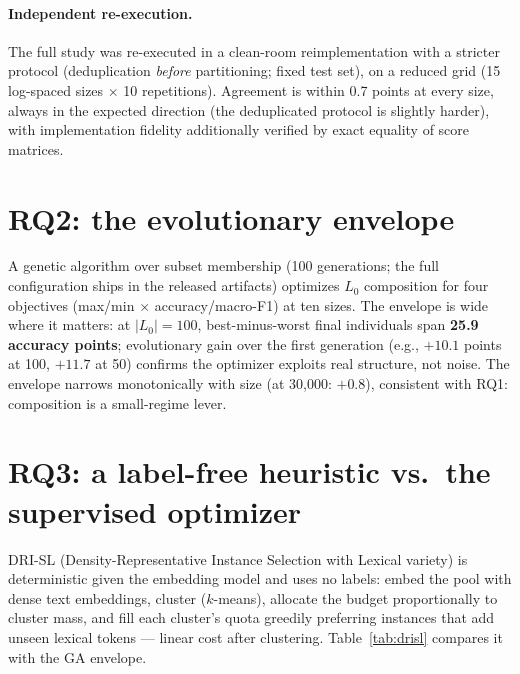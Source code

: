 \documentclass[11pt]{article}
\begin{document}
\paragraph{Independent re-execution.} The full study was re-executed in a
clean-room reimplementation with a stricter protocol (deduplication
\emph{before} partitioning; fixed test set), on a reduced grid (15
log-spaced sizes $\times$ 10 repetitions). Agreement is within 0.7 points
at every size, always in the expected direction (the deduplicated
protocol is slightly harder), with implementation fidelity additionally
verified by exact equality of score matrices.

\section{RQ2: the evolutionary envelope}
\label{sec:ga}

A genetic algorithm over subset membership (100 generations; the full
configuration ships in the released artifacts) optimizes $L_0$
composition for four objectives (max/min $\times$ accuracy/macro-F1) at ten sizes.
The envelope is wide where it matters: at $|L_0|=100$, best-minus-worst
final individuals span \textbf{25.9 accuracy points}; evolutionary gain
over the first generation (e.g., $+10.1$ points at 100, $+11.7$ at 50)
confirms the optimizer exploits real structure, not noise. The envelope
narrows monotonically with size (at 30{,}000: $+0.8$), consistent with
RQ1: composition is a small-regime lever.

\section{RQ3: a label-free heuristic vs.\ the supervised optimizer}
\label{sec:drisl}

DRI-SL (Density-Representative Instance Selection with Lexical variety)
is deterministic given the embedding model and uses no labels: embed
the pool with dense text embeddings, cluster ($k$-means), allocate the budget proportionally to
cluster mass, and fill each cluster's quota greedily preferring
instances that add unseen lexical tokens --- linear cost after
clustering. Table~\ref{tab:drisl} compares it with the GA envelope.
\end{document}
